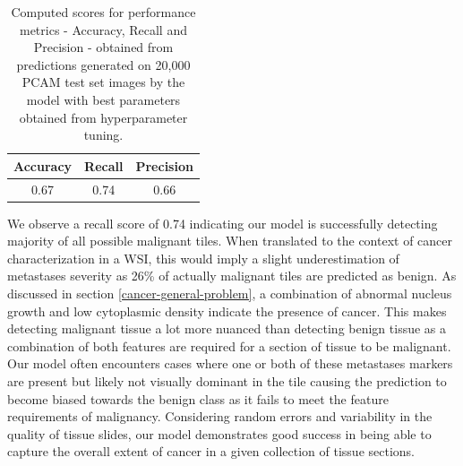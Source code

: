 \documentclass{l4proj}
\begin{document}
\begin{table}[h]
    \centering
    \begin{tabular}{c|c|c}
         Accuracy&Recall&Precision  \\ \hline
         0.67&0.74&0.66 
    \end{tabular}
    \caption{Computed scores for performance metrics - Accuracy, Recall and Precision - obtained from predictions generated on 20,000 PCAM test set images by the model with best parameters obtained from hyperparameter tuning.}
    \label{tab:metric-data}
\end{table}

We observe a recall score of 0.74 indicating our model is successfully detecting majority of all possible malignant tiles. When translated to the context of cancer characterization in a WSI, this would imply a slight underestimation of metastases severity as 26\% of actually malignant tiles are predicted as benign. As discussed in section \ref{cancer-general-problem}, a combination of abnormal nucleus growth and low cytoplasmic density indicate the presence of cancer. This makes detecting malignant tissue a lot more nuanced than detecting benign tissue as a combination of both features are required for a section of tissue to be malignant. Our model often encounters cases where one or both of these metastases markers are present but likely not visually dominant in the tile causing the prediction to become biased towards the benign class as it fails to meet the feature requirements of malignancy. Considering random errors and variability in the quality of tissue slides, our model demonstrates good success in being able to capture the overall extent of cancer in a given collection of tissue sections. 
\end{document}
